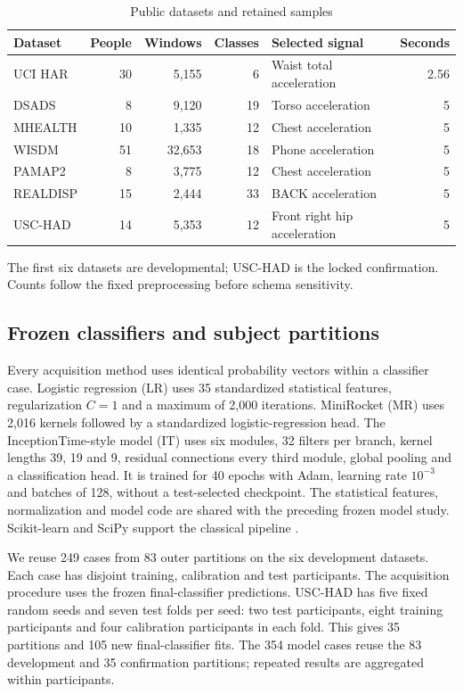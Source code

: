 \documentclass[preprint,12pt]{elsarticle}
\newcommand{\botrule}{\bottomrule}
\begin{document}
\begin{table}[!htbp]
\centering\small\setlength{\tabcolsep}{3pt}
\caption{Public datasets and retained samples}\label{tab:data}
\begin{tabular}{lrrrlr}
\toprule
Dataset & People & Windows & Classes & Selected signal & Seconds \\
\midrule
UCI HAR & 30 & 5,155 & 6 & Waist total acceleration & 2.56 \\
DSADS & 8 & 9,120 & 19 & Torso acceleration & 5 \\
MHEALTH & 10 & 1,335 & 12 & Chest acceleration & 5 \\
WISDM & 51 & 32,653 & 18 & Phone acceleration & 5 \\
PAMAP2 & 8 & 3,775 & 12 & Chest acceleration & 5 \\
REALDISP & 15 & 2,444 & 33 & BACK acceleration & 5 \\
USC-HAD & 14 & 5,353 & 12 & Front right hip acceleration & 5 \\
\botrule
\end{tabular}
\begin{minipage}{\textwidth}\footnotesize The first six datasets are developmental; USC-HAD is the locked confirmation. Counts follow the fixed preprocessing before schema sensitivity.\end{minipage}
\end{table}

\subsection{Frozen classifiers and subject partitions}
Every acquisition method uses identical probability vectors within a classifier case. Logistic regression (LR) uses 35 standardized statistical features, regularization $C=1$ and a maximum of 2,000 iterations. MiniRocket (MR) uses 2,016 kernels followed by a standardized logistic-regression head. The InceptionTime-style model (IT) uses six modules, 32 filters per branch, kernel lengths 39, 19 and 9, residual connections every third module, global pooling and a classification head. It is trained for 40 epochs with Adam, learning rate $10^{-3}$ and batches of 128, without a test-selected checkpoint. The statistical features, normalization and model code are shared with the preceding frozen model study. Scikit-learn and SciPy support the classical pipeline \cite{sklearn,scipy}.

We reuse 249 cases from 83 outer partitions on the six development datasets. Each case has disjoint training, calibration and test participants. The acquisition procedure uses the frozen final-classifier predictions. USC-HAD has five fixed random seeds and seven test folds per seed: two test participants, eight training participants and four calibration participants in each fold. This gives 35 partitions and 105 new final-classifier fits. The 354 model cases reuse the 83 development and 35 confirmation partitions; repeated results are aggregated within participants.
\end{document}
